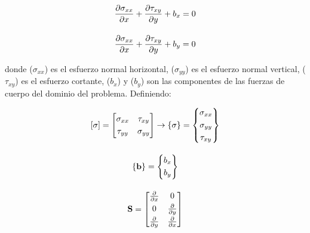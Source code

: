 \begin{ceqn} 
\begin{subequations} \label{eq:equ31} 
\begin{gather}
\normalsize{\frac{\partial\sigma_{xx}}{\partial x} + \frac{\partial\tau_{xy}}{\partial y} + b_x = 0} \label{eq:equ31a} \\[10pt]
\normalsize{\frac{\partial\sigma_{xx}}{\partial x} + \frac{\partial\tau_{xy}}{\partial y} + b_y = 0} \label{eq:equ31b} 
\end{gather}  
\end{subequations} 
\end{ceqn}
donde ($\sigma_{xx}$) es el esfuerzo normal horizontal, ($\sigma_{yy}$) es el esfuerzo normal vertical, ($\tau_{xy}$) es el esfuerzo cortante, ($b_{x}$) y ($b_{y}$) son las componentes de las fuerzas de cuerpo del dominio del problema. Definiendo:
\begin{ceqn} 
\begin{subequations} \label{eq:equ32} 
\begin{gather}
\normalsize{[\mathbf{\sigma}] = \begin{bmatrix}
       \sigma_{xx} & \tau_{xy}\\[0.3em]
       \tau_{yy} & \sigma_{yy}
       \end{bmatrix} \rightarrow 
       \{\mathbf{\sigma}\} = \begin{Bmatrix} 
       \sigma_{xx}\\[0.3em]
       \sigma_{yy}\\[0.3em]
       \tau_{xy}
       \end{Bmatrix}} \label{eq:equ32a} \\[10pt]
\normalsize{ \{\mathbf{b}\} = \begin{Bmatrix}
       b_{x} \\[0.3em]
       b_{y}
       \end{Bmatrix}} \label{eq:equ32b} \\[10pt]
\normalsize{\mathbf{S} = \begin{bmatrix}
       \frac{\partial}{\partial x} & 0\\[0.3em]
       0 & \frac{\partial}{\partial y}\\[0.3em]
       \frac{\partial}{\partial y} & \frac{\partial}{\partial x}
       \end{bmatrix}} \label{eq:equ32c} 
\end{gather}  
\end{subequations} 
\end{ceqn}

